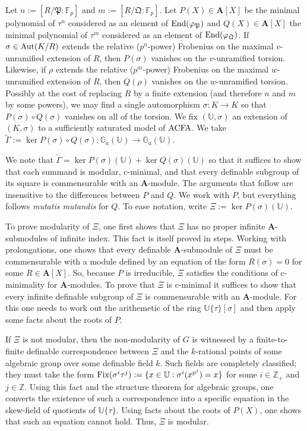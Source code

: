 \documentclass{amsart}
\newcommand{\ACFA}{{\rm ACFA}}
\newcommand{\Ga}{{{\mathbb G}_a}}
\newcommand{\FF}{{\mathbb F}}
\newcommand{\UU}{{\mathbb U}}
\newcommand{\ZZ}{{\mathbb Z}}
\newcommand{\fP}{{\mathfrak P}}
\newcommand{\fQ}{{\mathfrak Q}}
\newcommand{\bA}{{\mathbf A}}
\theoremstyle{definition}
\theoremstyle{remark}
\begin{document}
Let $n := [R/\fP:\FF_p]$ and $m := [R/\fQ:\FF_p]$.  Let $P(X) \in \bA[X]$ be the minimal
polynomial of $\tau^{n}$ considered as an element of ${\rm End}(\varphi_\fP)$ and 
$Q(X) \in \bA[X]$ the minimal polynomial of $\tau^m$  considered as an element of
 ${\rm End}(\varphi_\fQ)$.  If $\sigma \in {\rm Aut}(K/R)$ extends the relative 
($p^n$-power) Frobenius on the maximal $v$-unramified extension of $R$, 
then $P(\sigma)$ vanishes on the  $v$-unramified torsion.  Likewise, if $\rho$ extends the 
relative ($p^m$-power) Frobenius on the maximal $w$-unramified extension of $R$, then 
$Q(\rho)$ vanishes on the $w$-unramified torsion.  Possibly at the cost of replacing $R$ 
by a finite extension (and therefore $n$ and $m$ by some powers), we may find a single automorphism
$\sigma: K \to K$ so that $P(\sigma) \circ Q(\sigma)$ vanishes on all of the torsion.  
We fix $(\UU,\sigma)$ an extension of $(K,\sigma)$ to a sufficiently saturated 
model of $\ACFA$.  We take $\widetilde{\Gamma} := \ker P(\sigma) \circ Q(\sigma): 
\Ga(\UU) \to \Ga(\UU)$.    

We note that $\widetilde{\Gamma} = \ker P(\sigma)(\UU) + \ker Q(\sigma)(\UU)$
so that it suffices to show that each summand is modular, c-minimal, and that
every definable subgroup of its square is commensurable with an $\bA$-module.
The arguments that follow are insensitive to the differences between $P$ and $Q$.
We work with $P$, but everything follows \emph{mutatis mutandis} for $Q$.
To ease notation, write $\Xi := \ker P(\sigma) (\UU)$.    

To prove modularity of $\Xi$, one first shows that $\Xi$ has no proper infinite
$\bA$-submodules of infinite index.  This fact 
is itself proved in steps.  Working with prolongations, one shows that every
definable $\bA$-submodule of $\Xi$ must be commensurable with a module
defined by an equation of the form $R(\sigma) = 0$ for some $R \in \bA[X]$. 
So, because $P$ is irreducible, $\Xi$ satisfies the conditions of c-minimality
for $\bA$-modules.  To prove that $\Xi$ is c-minimal it suffices to show that every infinite
definable subgroup of $\Xi$ is commensurable with an $\bA$-module.   For this
one needs to work out the arithemetic of the ring $\UU \{ \tau \} [\sigma]$
and then apply some facts about the roots of $P$.

If $\Xi$ is not modular, then the non-modularity of $G$ is witnessed by a finite-to-finite definable
correspondence between $\Xi$ and the $k$-rational points of some algebraic group over 
some definable field $k$.  Such fields are completely classified; they must take the 
form ${\rm Fix}(\sigma^i \tau^j) := \{ x \in \UU : \sigma^i (x^{p^j}) = x \}$ for some 
$i \in \ZZ_+$ and $j \in \ZZ$.  Using this fact and the structure theorem for 
algebraic groups, one converts the existence of such a correspondence into a specific
equation in the skew-field of quotients of $\UU \{ \tau \}$.  Using facts about 
the roots of $P(X)$, one shows that such an equation cannot hold.   Thus, $\Xi$ is modular.
\end{document}
